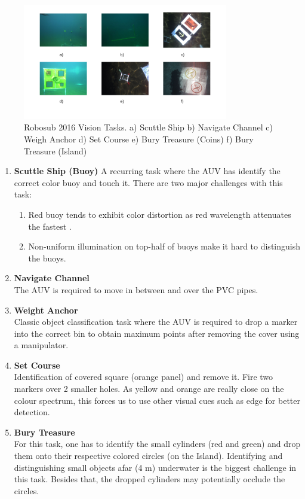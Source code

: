 \documentclass[fypca]{socreport}
\begin{document}
\begin{figure}[ht]
\centering

        \includegraphics[width=0.8\textwidth, height=0.3\textheight]{robosub_vision_tasks.png}
        \caption{Robosub 2016 Vision Tasks. a) Scuttle Ship b) Navigate Channel c) Weigh Anchor d) Set Course e) Bury Treasure (Coins) f) Bury Treasure (Island)}
        \label{fig:robosub2016_tasks}

\end{figure}

\begin{enumerate}
    \item \textbf{Scuttle Ship (Buoy)}
        A recurring task where the AUV has identify the correct color buoy and touch it. There are two major challenges with this task:
        \begin{enumerate}[labels=(\alph*)]
        \item Red buoy tends to exhibit color distortion as red wavelength attenuates the fastest \cite{Galdran2015}.
        \item Non-uniform illumination on top-half of buoys make it hard to distinguish the buoys.
        \end{enumerate}
    \item \textbf{Navigate Channel} \\
        The AUV is required to move in between and over the PVC pipes.
    \item \textbf{Weight Anchor} \\
        Classic object classification task where the AUV is required to drop a marker into the correct bin to obtain maximum points after removing the cover using a manipulator.
    \item \textbf{Set Course} \\
        Identification of covered square (orange panel) and remove it. Fire two markers over 2 smaller holes. As yellow and orange are really close on the colour spectrum, this forces us to use other visual cues such as edge for better detection.
    \item \textbf{Bury Treasure} \\
        For this task, one has to identify the small cylinders (red and green) and drop them onto their respective colored circles (on the Island). Identifying and distinguishing small objects afar (4 m) underwater is the biggest challenge in this task. Besides that, the dropped cylinders may potentially occlude the circles.
\end{enumerate}
\end{document}
